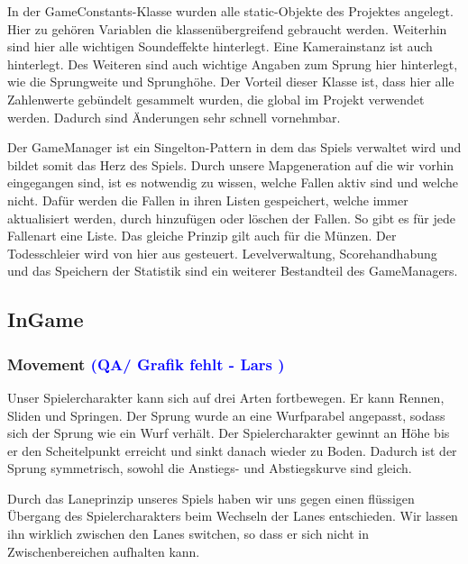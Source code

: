 \documentclass[12pt]{article}
\begin{document}
In der GameConstants-Klasse wurden alle static-Objekte des Projektes angelegt. Hier zu gehören Variablen die klassenübergreifend gebraucht werden.
Weiterhin sind hier alle wichtigen Soundeffekte hinterlegt. Eine Kamerainstanz ist auch hinterlegt. Des Weiteren sind auch wichtige Angaben zum Sprung
hier hinterlegt, wie die Sprungweite und Sprunghöhe. Der Vorteil dieser Klasse ist, dass hier alle Zahlenwerte gebündelt gesammelt wurden, die global im
Projekt verwendet werden. Dadurch sind Änderungen sehr schnell vornehmbar.

\noindent Der GameManager ist ein Singelton-Pattern in dem das Spiels verwaltet wird und bildet somit das Herz des Spiels. Durch unsere Mapgeneration auf die wir
vorhin eingegangen sind, ist es notwendig zu wissen, welche Fallen aktiv sind und welche nicht. Dafür werden die Fallen in ihren Listen gespeichert, welche
immer aktualisiert werden, durch hinzufügen oder löschen der Fallen. So gibt es für jede Fallenart eine Liste. Das gleiche Prinzip gilt auch für die Münzen.
Der Todesschleier wird von hier aus gesteuert. Levelverwaltung, Scorehandhabung und das Speichern der Statistik sind ein weiterer Bestandteil des GameManagers.

\vspace{2cm}
\subsection{InGame}

\vspace{1cm}
\subsubsection{Movement \textcolor{blue}{(QA/ Grafik fehlt - Lars )}}

Unser Spielercharakter kann sich auf drei Arten fortbewegen. Er kann Rennen, Sliden und Springen. Der Sprung wurde an eine
Wurfparabel angepasst, sodass sich der Sprung wie ein Wurf verhält. Der Spielercharakter gewinnt an Höhe bis er den Scheitelpunkt
erreicht und sinkt danach wieder zu Boden. Dadurch ist der Sprung symmetrisch, sowohl die Anstiegs- und Abstiegskurve sind gleich.


\noindent Durch das Laneprinzip unseres Spiels haben wir uns gegen einen flüssigen Übergang des Spielercharakters beim Wechseln der Lanes
entschieden. Wir lassen ihn wirklich zwischen den Lanes switchen, so dass er sich nicht in Zwischenbereichen aufhalten kann.
\end{document}
